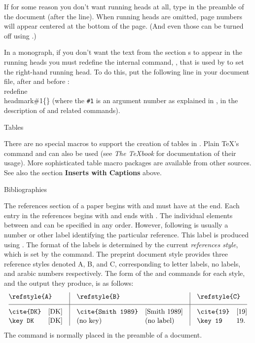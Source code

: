 If for some reason you don't want running heads at all, type
 in the preamble of the document (after the
 line).  When running heads are omitted, page numbers
will appear centered at the bottom of the page.  (And even those can be
turned off using .)

In a monograph, if you don't want
the text from the section s to appear in the running heads
you must redefine the internal command, , that is used
by  to set the right-hand running head. To do this, put the
following line in your document file, after  and
before :
\beginexample{}
\\redefine\\headmark\#1\{\}
\endexample
\noindent (where the {\tt\#1} is an argument number as explained in \Joy,
in the description of  and related commands).

\subhead Tables \endsubhead

There are no special macros to support the creation of tables in
\AmSTeX{}. Plain \TeX{}'s 
command and  can also be used (see {\it The \TeX{}book} for
documentation of their usage). More sophisticated table macro packages
are available from other sources. See also the section {\bf Inserts with
Captions} above.

\subhead Bibliographies \endsubhead

The references section of a paper begins with  and must have
 at the end.  Each entry in the references begins with
 and ends with .  The individual elements between
 and  can be specified in any order. However,
following  is usually a number or other label identifying the
particular reference. This label is produced using .
The format of the labels is determined by the current
{\it references style}, which is set by the 
command. The preprint document style provides three reference
styles denoted A, B, and C, corresponding to
letter labels, no labels, and arabic numbers respectively.
The form of the  and  commands for each
style, and the output they produce, is as follows:
$$
\vbox{\offinterlineskip\def\strut{\vrule depth.35\normalbaselineskip
  width0pt height.75\normalbaselineskip}\tabskip0pt
  \halign{{\tt\strut#}\hfil&\quad#\hfil&\quad\vrule\quad{\tt#}\hfil&
       \quad#\hfil&\quad\vrule\quad{\tt#}\hfil&\quad#\hfil\cr
\multispan2\strut depth.7\normalbaselineskip\cs{refstyle\{A\}}&
       \multispan2\quad\vrule\quad\cs{refstyle\{B\}}&
       \multispan2\quad\vrule\quad\cs{refstyle\{C\}}\cr
%
\noalign{\hrule}
%
 height1.1\normalbaselineskip\cs{cite\{DK\}}& [DK]&
       \cs{cite\{Smith 1989\}}& [Smith 1989]&
       \cs{cite\{19\}}& [19]\cr
%
\cs{key DK}& [DK]&
       \omit\quad\vrule\quad(no key)\hfil & (no label)&
       \cs{key 19}& 19.\cr
}}$$
The  command is normally placed in the preamble of
a document.

